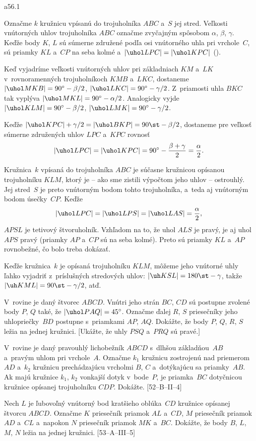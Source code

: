 {%
\epsplace a56.1 \hfil\Obr

Označme $k$ kružnicu vpísanú do trojuholníka $ABC$ a~$S$ jej
stred. Veľkosti vnútorných uhlov trojuholníka $ABC$ označme
zvyčajným spôsobom $\alpha$, $\beta$, $\gamma$. Keďže body $K$,
$L$ sú súmerne združené podľa osi vnútorného uhla pri
vrchole~$C$, sú priamky $KL$ a~$CP$ na seba kolmé a~$|\uhol LPC|=|\uhol KPC|$ (\obr).

\inspicture{}

Keď vyjadríme veľkosti vnútorných uhlov pri základniach $KM$ a~$LK$
v~rovnoramenných trojuholníkoch $KMB$ a~$LKC$, dostaneme $|\uhol
MKB|=90^{\circ}-\beta/2$, $|\uhol
LKC|=90^{\circ}-\gamma/2$.  Z~priamosti uhla $BKC$ tak vyplýva
$|\uhol MKL|=90^{\circ}-\alpha/2$. Analogicky vyjde
$|\uhol KLM|=90^{\circ}-\beta/2$, $|\uhol
LMK|=90^{\circ}-\gamma/2$.

Keďže $|\uhol KPC|+\gamma/2=|\uhol BKP|=90\st-\beta/2$,
dostaneme pre veľkosť súmerne združených uhlov $LPC$ a~$KPC$ rovnosť
$$
|\uhol LPC|=|\uhol KPC|=90^{\circ}-\frac{\beta+\gamma}2=\frac{\alpha}2.
$$

Kružnica~$k$ vpísaná do trojuholníka $ABC$ je súčasne kružnicou
opísanou trojuholníku $KLM$, ktorý je -- ako sme zistili výpočtom
jeho uhlov -- ostrouhlý. Jej stred~$S$ je preto vnútorným bodom
tohto trojuholníka, a~teda aj vnútorným bodom úsečky~$CP$.
Keďže
$$
|\uhol LPC|=|\uhol LPS|=|\uhol LAS|=\frac{\alpha}2,
$$
$APSL$ je tetivový štvoruholník. Vzhľadom na to, že uhol $ALS$ je
pravý, je aj uhol $APS$ pravý (priamky $AP$ a~$CP$ sú na seba
kolmé). Preto sú priamky $KL$ a~$AP$ rovnobežné, čo bolo treba dokázať.

\poznamka
Keďže kružnica~$k$ je opísaná trojuholníku $KLM$, môžeme
jeho vnútorné uhly ľahko vyjadriť z~príslušných stredových uhlov:
$|\uh KSL|=180\st-\gamma$, takže $|\uh KML|=90\st-\gamma/2$, atď.


V~rovine je daný štvorec $ABCD$. Vnútri jeho strán $BC$, $CD$ sú
postupne zvolené body $P$, $Q$ také, že $|\uhol
PAQ|=45^{\circ}$. Označme ďalej $R$, $S$ priesečníky jeho
uhlopriečky~$BD$ postupne s~priamkami $AP$, $AQ$. Dokážte, že body
$P$, $Q$, $R$, $S$ ležia na jednej kružnici. [Ukážte, že uhly $PSQ$
a~$PRQ$ sú pravé.]

V~rovine je daný pravouhlý lichobežník $ABCD$ s~dlhšou
základňou~$AB$ a~pravým uhlom pri vrchole~$A$. Označme $k_1$
kružnicu zostrojenú nad priemerom~$AD$ a~$k_2$ kružnicu
prechádzajúcu vrcholmi $B$, $C$ a~dotýkajúcu sa priamky~$AB$.
Ak majú kružnice $k_1$, $k_2$ vonkajší dotyk v~bode~$P$, je
priamka~$BC$ dotyčnicou kružnice opísanej trojuholníku $CDP$. Dokážte.
[52--B--II--4]

Nech $L$ je ľubovoľný vnútorný bod kratšieho oblúka~$CD$ kružnice
opísanej štvorcu $ABCD$. Označme $K$ priesečník priamok $AL$
a~$CD$, $M$ priesečník priamok $AD$ a~$CL$ a~napokon $N$ priesečník priamok
$MK$ a~$BC$. Dokážte, že body $B$, $L$, $M$, $N$ ležia na jednej
kružnici. [53--A--III--5]

}

